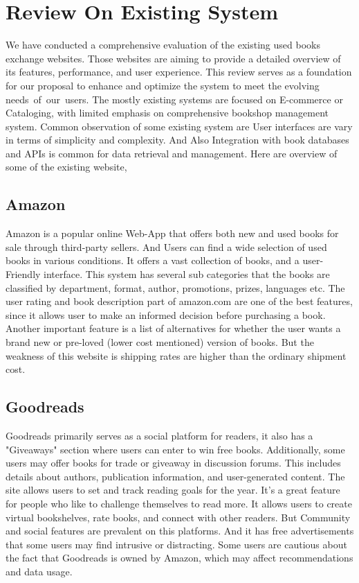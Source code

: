 \documentclass{article}
\begin{document}
\section{Review On Existing System}


We have conducted a comprehensive evaluation of the existing used books exchange websites. 
Those websites are aiming to provide a detailed overview of its features, performance, and user experience. 
This review serves as a foundation for our proposal to enhance and optimize the system to meet the evolving needs of our users. 
The mostly existing systems are focused on E-commerce or Cataloging, with limited emphasis on comprehensive bookshop management system.
Common observation of some existing system are User interfaces are vary in terms of simplicity and complexity.
 And Also Integration with book databases and APIs is common for data retrieval and management.
Here are overview of some of the existing website,

  \subsection{Amazon} 
      Amazon is a popular online Web-App that offers both new and used books for sale through third-party sellers. 
      And Users can find a wide selection of used books in various conditions. It offers a vast collection of books, and a user-Friendly interface.
      This system has several sub categories that the books are classified by department, format, author, promotions, prizes, languages etc.
      The user rating and book description part of amazon.com are one of the best features, since it allows user to make an informed decision before purchasing a book.
      Another important feature is a list of alternatives for whether the user wants a brand new or pre-loved (lower cost mentioned) version of books. 
      But the weakness of this website is shipping rates are higher than the ordinary shipment cost. 


    \subsection{Goodreads}  
	Goodreads primarily serves as a social platform for readers, it also has a "Giveaways" section where users can enter to win free books.
 	Additionally, some users may offer books for trade or giveaway in discussion forums. 
	This includes details about authors, publication information, and user-generated content. 
	The site allows users to set and track reading goals for the year. 
	It's a great feature for people who like to challenge themselves to read more.
	It allows users to create virtual bookshelves, rate books, and connect with other readers. 
	But Community and social features are prevalent on this platforms. 
	And it has free advertisements that some users may find intrusive or distracting. 
	Some users are cautious about the fact that Goodreads is owned by Amazon, which may affect recommendations and data usage.
\end{document}

